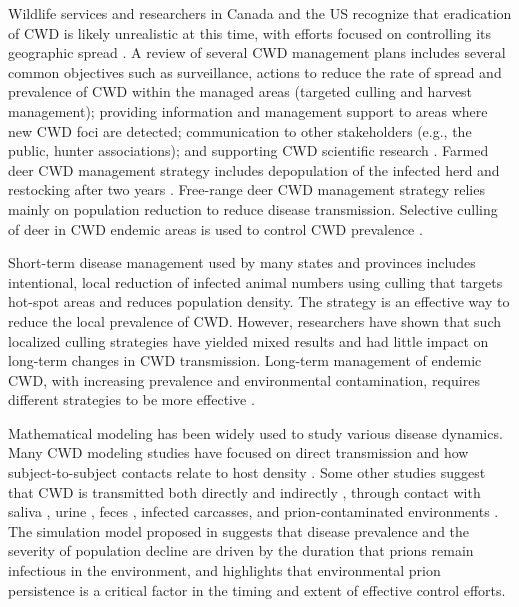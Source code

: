 \documentclass[12pt,a4paper,reqno]{amsart}
\theoremstyle{definition}
\theoremstyle{remark}
\theoremstyle{plain}
\begin{document}
Wildlife services and researchers in Canada and the US recognize that eradication of CWD is likely unrealistic at this time, with efforts focused on controlling its geographic spread \cite{rivera2019chronic}. A review of several CWD management plans includes several common objectives such as surveillance, actions to reduce the rate of spread and prevalence of CWD within the managed areas (targeted culling and harvest management); providing information and management support to areas where new CWD foci are detected; communication to other stakeholders (e.g., the public, hunter associations); and supporting CWD scientific research \cite{conner2021relationship}. Farmed deer CWD management strategy includes depopulation of the infected herd and restocking after two years \cite{mysterud2019review}. Free-range deer CWD management strategy relies mainly on population reduction to reduce disease transmission. Selective culling of deer in CWD endemic areas is used to control CWD prevalence \cite{conner2021relationship}.

Short-term disease management used by many states and provinces includes intentional, local reduction of infected animal numbers using culling that targets hot-spot areas and reduces population density. The strategy is an effective way to reduce the local prevalence of CWD. However, researchers have shown that such localized culling strategies have yielded mixed results and had little impact on long-term changes in CWD transmission. Long-term management of endemic CWD, with increasing prevalence and environmental contamination, requires different strategies to be more effective \cite{wolfe2018evaluation, conner2021relationship}.

Mathematical modeling has been widely used to study various disease dynamics. Many CWD modeling studies have focused on direct transmission and how subject-to-subject contacts relate to host density \cite{gross2001chronic, schauber2003chronic, wasserberg2009host}. Some other studies suggest that CWD is transmitted both directly and indirectly \cite{miller2004environmental, mathiason2009infectious, miller1998epidemiology}, through contact with saliva \cite{haley2009detection, mathiason2006infectious}, urine \cite{haley2009detection}, feces \cite{tamguney2009asymptomatic}, infected carcasses, and prion-contaminated environments \cite{david2011soil, schramm2006potential}. The simulation model proposed in \cite{almberg2011modeling} suggests that disease prevalence and the severity of population decline are driven by the duration that prions remain infectious in the environment, and highlights that environmental prion persistence is a critical factor in the timing and extent of effective control efforts.
\end{document}
